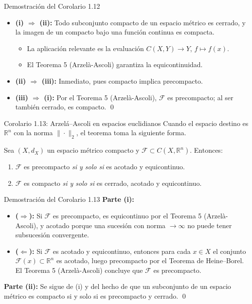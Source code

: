\begin{frame}{Demostración del Corolario 1.12}
    \begin{itemize}
        \item \textbf{(i) $\Rightarrow$ (ii):} Todo subconjunto compacto de un espacio métrico es cerrado, y la imagen de un compacto bajo una función continua es compacta.
        \begin{itemize}
            \item La aplicación relevante es la evaluación $C(X,Y) \to Y$, $f \mapsto f(x)$.
            \item El Teorema 5 (Arzelà-Ascoli) garantiza la equicontinuidad.
        \end{itemize}
        \item \textbf{(ii) $\Rightarrow$ (iii):} Inmediato, pues compacto implica precompacto.
        \item \textbf{(iii) $\Rightarrow$ (i):} Por el Teorema 5 (Arzelà-Ascoli), $\mathcal{F}$ es precompacto; al ser también cerrado, es compacto. \qed
    \end{itemize}
\end{frame}

\begin{frame}{Corolario 1.13: Arzelá--Ascoli en espacios euclidianos}
    Cuando el espacio destino es $\mathbb{R}^n$ con la norma $\|\cdot\|_2$, el teorema toma la siguiente forma.
    \begin{corolario}
        Sea $(X, d_X)$ un espacio métrico compacto y $\mathcal{F} \subset C(X, \mathbb{R}^n)$. Entonces:
        \begin{enumerate}
            \item $\mathcal{F}$ es precompacto \textit{si y solo si} es acotado y equicontinuo.
            \item $\mathcal{F}$ es compacto \textit{si y solo si} es cerrado, acotado y equicontinuo.
        \end{enumerate}
    \end{corolario}
\end{frame}

\begin{frame}{Demostración del Corolario 1.13}
    \textbf{Parte (i):}
    \begin{itemize}
        \item \textbf{($\Rightarrow$):} Si $\mathcal{F}$ es precompacto, es equicontinuo por el Teorema 5 (Arzelà-Ascoli), y acotado porque una sucesión con norma $\to \infty$ no puede tener subsucesión convergente.
        \item \textbf{($\Leftarrow$):} Si $\mathcal{F}$ es acotado y equicontinuo, entonces para cada $x \in X$ el conjunto $\mathcal{F}(x) \subset \mathbb{R}^n$ es acotado, luego precompacto por el Teorema de Heine--Borel. El Teorema 5 (Arzelà-Ascoli) concluye que $\mathcal{F}$ es precompacto.
    \end{itemize}
    \medskip
    \textbf{Parte (ii):} Se sigue de (i) y del hecho de que un subconjunto de un espacio métrico es compacto si y solo si es precompacto y cerrado. \qed
\end{frame}


